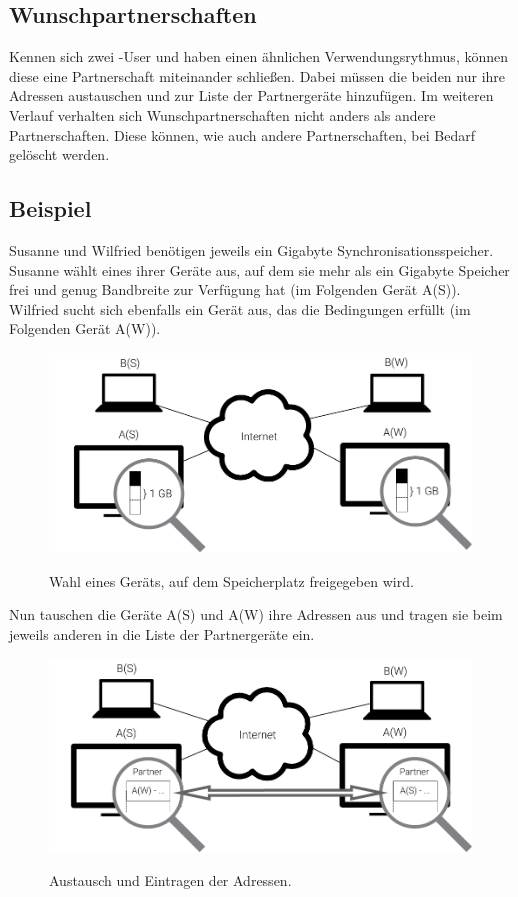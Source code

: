 \subsection{Wunschpartnerschaften}
Kennen sich zwei \sblit-User und haben einen ähnlichen Verwendungsrythmus, können diese
eine Partnerschaft miteinander schließen. Dabei müssen die beiden nur ihre Adressen
austauschen und zur Liste der Partnergeräte hinzufügen. Im weiteren Verlauf verhalten
sich Wunschpartnerschaften nicht anders als andere Partnerschaften. Diese können, wie
auch andere Partnerschaften, bei Bedarf gelöscht werden.

\subsection{Beispiel}
Susanne und Wilfried benötigen jeweils ein Gigabyte Synchronisationsspeicher. Susanne
wählt eines ihrer Geräte aus, auf dem sie mehr als ein Gigabyte Speicher frei und genug
Bandbreite zur Verfügung hat (im Folgenden Gerät A(S)). Wilfried sucht sich ebenfalls ein
Gerät aus, das die Bedingungen erfüllt (im Folgenden Gerät A(W)).
\begin{figure}[htb]
	\centering
  \includegraphics[]{images/partnerschaften_1.pdf}
	\label{partnerschaften_1}
  \caption{Wahl eines Geräts, auf dem Speicherplatz freigegeben wird.}
\end{figure}
Nun tauschen die Geräte A(S) und A(W) ihre Adressen aus und tragen sie beim jeweils anderen
in die Liste der Partnergeräte ein.
\begin{figure}[htb]
	\centering
  \includegraphics[]{images/partnerschaften_2.pdf}
	\label{partnerschaften_2}
  \caption{Austausch und Eintragen der Adressen.}
\end{figure}
